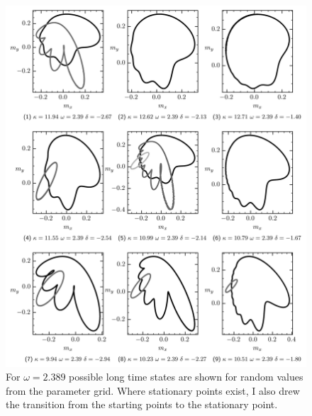     \begin{figure}[H]
        \centering
        \includegraphics{pictures/lc_traj_wcut3.png}
        \caption{For $\omega=2.389$ possible long time states are shown for random values from the parameter grid. Where stationary points exist, I also drew the transition from the starting points to the stationary point.}
    \end{figure}
    
